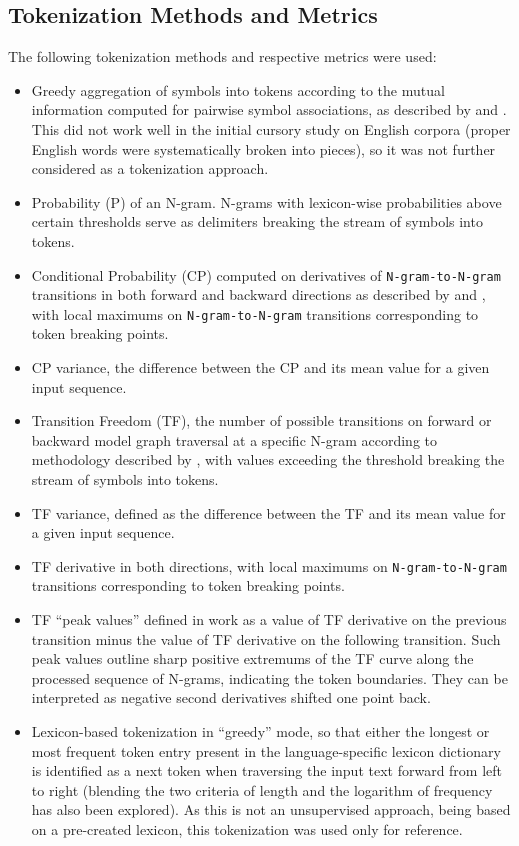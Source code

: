 \documentclass[11pt]{article}
\begin{document}
\subsection{\label{s2}Tokenization Methods and Metrics}
The following tokenization methods and respective metrics were used:
\begin{itemize}
\item Greedy aggregation of symbols into tokens according to the mutual information computed for pairwise symbol associations, as described by \citet{7} and \citet{11}. This did not work well in the initial cursory study on English corpora (proper English words were systematically broken into pieces), so it was not further considered as a tokenization approach.  
\item Probability (P) of an N-gram. N-grams with lexicon-wise probabilities above certain thresholds serve as delimiters breaking the stream of symbols into tokens.
\item Conditional Probability (CP) computed on derivatives of \texttt{N-gram-to-N-gram} transitions in both forward and backward directions as described by \citet{11} and \citet{12}, with local maximums on \texttt{N-gram-to-N-gram} transitions corresponding to token breaking points. 
\item CP variance, the difference between the CP and its mean value for a given input sequence.
\item Transition Freedom (TF), the number of possible transitions on forward or backward model graph traversal at a specific N-gram according to methodology described by \citet{12}, with values exceeding the threshold breaking the stream of symbols into tokens. 
\item TF variance, defined as the difference between the TF and its mean value for a given input sequence.
\item TF derivative in both directions, with local maximums on \texttt{N-gram-to-N-gram} transitions corresponding to token breaking points.
\item TF “peak values” defined in  work as a value of TF derivative on the previous transition minus the value of TF derivative on the following transition. Such peak values outline sharp positive extremums of the TF curve along the processed sequence of N-grams, indicating the token boundaries. They can be interpreted as negative second derivatives shifted one point back.
\item Lexicon-based tokenization in “greedy” mode, so that either the longest or most frequent token entry present in the language-specific lexicon dictionary is identified as a next token when traversing the input text forward from left to right (blending the two criteria of length and the logarithm of frequency has also been explored). As this is not an unsupervised approach, being based on a pre-created lexicon, this tokenization was used only for reference.

\end{itemize}
\end{document}
